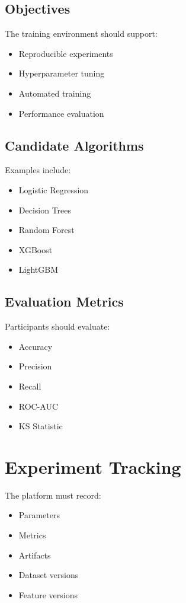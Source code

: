\subsection{Objectives}

The training environment should support:

\begin{itemize}
    \item Reproducible experiments
    \item Hyperparameter tuning
    \item Automated training
    \item Performance evaluation
\end{itemize}

\subsection{Candidate Algorithms}

Examples include:

\begin{itemize}
    \item Logistic Regression
    \item Decision Trees
    \item Random Forest
    \item XGBoost
    \item LightGBM
\end{itemize}

\subsection{Evaluation Metrics}

Participants should evaluate:

\begin{itemize}
    \item Accuracy
    \item Precision
    \item Recall
    \item ROC-AUC
    \item KS Statistic
\end{itemize}

\section{Experiment Tracking}

The platform must record:

\begin{itemize}
    \item Parameters
    \item Metrics
    \item Artifacts
    \item Dataset versions
    \item Feature versions
\end{itemize}

